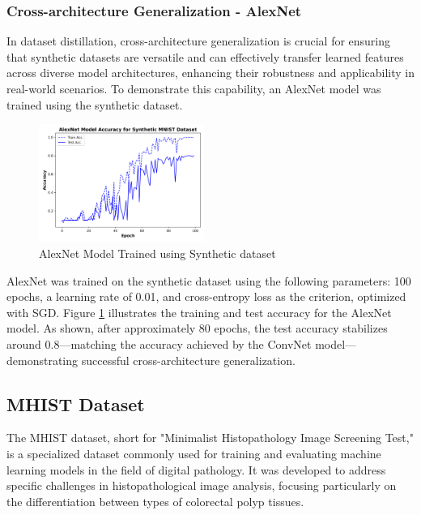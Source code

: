 \documentclass[conference, compsoc]{IEEEtran}
\begin{document}
	\subsubsection{Cross-architecture Generalization - AlexNet}\hfill
	
	In dataset distillation, cross-architecture generalization is crucial for ensuring that synthetic datasets are versatile and can effectively transfer learned features across diverse model architectures, enhancing their robustness and applicability in real-world scenarios. To demonstrate this capability, an AlexNet model was trained using the synthetic dataset.
	
	\begin{figure}[H]
		\centering
		\includegraphics[width=0.48\textwidth]{mnist_alex_acc.png}
		\caption{AlexNet Model Trained using Synthetic dataset}
		\label{fig:mnist_alex_acc}
	\end{figure}
	
	AlexNet was trained on the synthetic dataset using the following parameters: 100 epochs, a learning rate of 0.01, and cross-entropy loss as the criterion, optimized with SGD. Figure \ref{fig:mnist_alex_acc} illustrates the training and test accuracy for the AlexNet model. As shown, after approximately 80 epochs, the test accuracy stabilizes around 0.8—matching the accuracy achieved by the ConvNet model—demonstrating successful cross-architecture generalization.
	
	\subsection{MHIST Dataset}
	The MHIST dataset, short for "Minimalist Histopathology Image Screening Test," is a specialized dataset commonly used for training and evaluating machine learning models in the field of digital pathology. It was developed to address specific challenges in histopathological image analysis, focusing particularly on the differentiation between types of colorectal polyp tissues.
	
\end{document}

